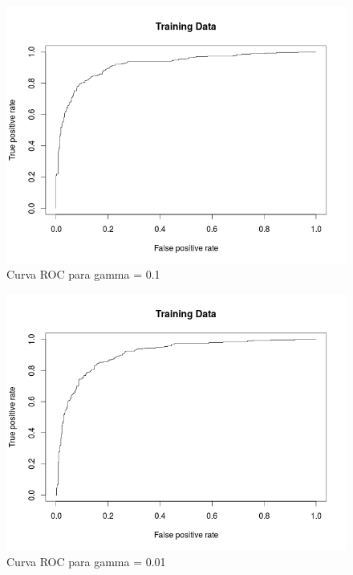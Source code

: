 \begin{figure}[H]
\centering
\includegraphics[scale=0.50]{ej1-53.png}
\caption{Curva ROC para gamma = 0.1}
\label{}
\end{figure}

\begin{figure}[H]
\centering
\includegraphics[scale=0.50]{ej1-54.png}
\caption{Curva ROC para gamma = 0.01}
\label{}
\end{figure}

